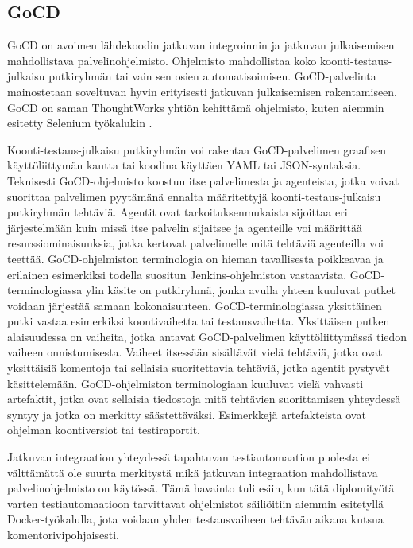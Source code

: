   \subsection{GoCD} \label{ch:08_gocd}

    GoCD on avoimen lähdekoodin jatkuvan integroinnin ja jatkuvan julkaisemisen mahdollistava palvelinohjelmisto.
    Ohjelmisto mahdollistaa koko koonti-testaus-julkaisu putkiryhmän tai vain sen osien automatisoimisen.
    GoCD-palvelinta mainostetaan soveltuvan hyvin erityisesti jatkuvan julkaisemisen rakentamiseen.
    GoCD on saman ThoughtWorks yhtiön kehittämä ohjelmisto, kuten aiemmin esitetty Selenium työkalukin \parencite{gocd_info}.

    Koonti-testaus-julkaisu putkiryhmän voi rakentaa GoCD-palvelimen graafisen käyttöliittymän kautta tai koodina käyttäen YAML tai JSON-syntaksia.
    Teknisesti GoCD-ohjelmisto koostuu itse palvelimesta ja agenteista, jotka voivat suorittaa palvelimen pyytämänä ennalta määritettyjä koonti-testaus-julkaisu putkiryhmän tehtäviä.
    Agentit ovat tarkoituksenmukaista sijoittaa eri järjestelmään kuin missä itse palvelin sijaitsee ja agenteille voi määrittää resurssiominaisuuksia, jotka kertovat palvelimelle mitä tehtäviä agenteilla voi teettää.
    GoCD-ohjelmiston terminologia on hieman tavallisesta poikkeavaa ja erilainen esimerkiksi todella suositun Jenkins-ohjelmiston vastaavista.
    GoCD-terminologiassa ylin käsite on putkiryhmä, jonka avulla yhteen kuuluvat putket voidaan järjestää samaan kokonaisuuteen.
    GoCD-terminologiassa yksittäinen putki vastaa esimerkiksi koontivaihetta tai testausvaihetta.
    Yksittäisen putken alaisuudessa on vaiheita, jotka antavat GoCD-palvelimen käyttöliittymässä tiedon vaiheen onnistumisesta.
    Vaiheet itsessään sisältävät vielä tehtäviä, jotka ovat yksittäisiä komentoja tai sellaisia suoritettavia tehtäviä, jotka agentit pystyvät käsittelemään.
    GoCD-ohjelmiston terminologiaan kuuluvat vielä vahvasti artefaktit, jotka ovat sellaisia tiedostoja mitä tehtävien suorittamisen yhteydessä syntyy ja jotka on merkitty säästettäväksi.
    Esimerkkejä artefakteista ovat ohjelman koontiversiot tai testiraportit.

    Jatkuvan integraation yhteydessä tapahtuvan testiautomaation puolesta ei välttämättä ole suurta merkitystä mikä jatkuvan integraation mahdollistava palvelinohjelmisto on käytössä.
    Tämä havainto tuli esiin, kun tätä diplomityötä varten testiautomaatioon tarvittavat ohjelmistot säiliöitiin aiemmin esitetyllä Docker-työkalulla, jota voidaan yhden testausvaiheen tehtävän aikana kutsua komentorivipohjaisesti.

